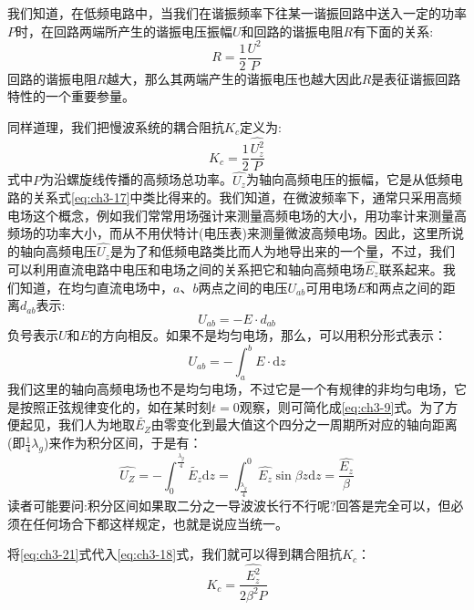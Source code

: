 我们知道，在低频电路中，当我们在谐振频率下往某一谐振回路中送入一定的功率$ P $时，在回路两端所产生的谐振电压振幅$ U $和回路的谐振电阻$ R $有下面的关系:
\begin{equation} \label{eq:ch3-17}
	R = \frac{1}{2}\frac{U^2}{P}
\end{equation}
回路的谐振电阻$ R $越大，那么其两端产生的谐振电压也越大因此$ R $是表征谐振回路特性的一个重要参量。

同样道理，我们把慢波系统的耦合阻抗$ K_c $定义为:
\begin{equation} \label{eq:ch3-18}
	K_c = \frac{1}{2}\frac{\hat{U_z^2}}{P}
\end{equation}
式中$ P $为沿螺旋线传播的高频场总功率。$ \hat{U_z} $为轴向高频电压的振幅，它是从低频电路的关系式\ref{eq:ch3-17}中类比得来的。我们知道，在微波频率下，通常只采用高频电场这个概念，例如我们常常用场强计来测量高频电场的大小，用功率计来测量高频场的功率大小，而从不用伏特计(电压表)来测量微波高频电场。因此，这里所说的轴向高频电压$ \hat{U_z} $是为了和低频电路类比而人为地导出来的一个量，不过，我们可以利用直流电路中电压和电场之间的关系把它和轴向高频电场$ \hat{E_z} $联系起来。我们知道，在均匀直流电场中，$ a $、$ b $两点之间的电压$ U_{ab} $可用电场$ E $和两点之间的距离$ d_{ab} $表示:
\begin{equation} \label{eq:ch3-19}
	U_{ab} = -E\cdot d_{ab}
\end{equation}
负号表示$ U $和$ E $的方向相反。如果不是均匀电场，那么，可以用积分形式表示：
\begin{equation} \label{eq:ch3-20}
	U_{ab} = - \int_{a}^{b}E \cdot \text{d}z
\end{equation}
我们这里的轴向高频电场也不是均匀电场，不过它是一个有规律的非均匀电场，它是按照正弦规律变化的，如在某时刻$ t=0 $观察，则可简化成\ref{eq:ch3-9}式。为了方便起见，我们人为地取$ \tilde{E_Z} $由零变化到最大值这个四分之一周期所对应的轴向距离(即$\frac{1}{4}\lambda_g$)来作为积分区间，于是有：
\begin{equation} \label{eq:ch3-21}
	\hat{U_Z} = -\int_{0}^{\frac{\lambda_g}{4}}\tilde{E_z}\text{d}z=\int_{\frac{\lambda_g}{4}}^{0}\hat{E_z}\sin{\beta z}\text{d}z=\frac{\hat{E_z}}{\beta}
\end{equation}
读者可能要问:积分区间如果取二分之一导波波长行不行呢?回答是完全可以，但必须在任何场合下都这样规定，也就是说应当统一。

将\ref{eq:ch3-21}式代入\ref{eq:ch3-18}式，我们就可以得到耦合阻抗$ K_c $：
\begin{equation} \label{eq:ch3-22}
	K_c = \frac{\hat{E_z^2}}{2\beta^2P}
\end{equation}

